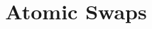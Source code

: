 \documentclass{llncs}
\begin{document}
\title{Atomic Swaps}
\maketitle              %

\begin{abstract}
\end{abstract}




\end{document}

